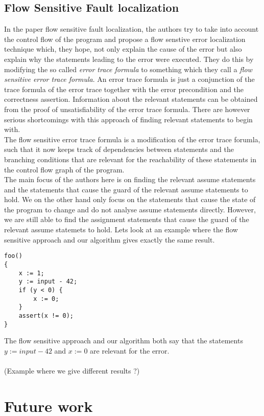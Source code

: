 \documentclass{article}
\begin{document}
\subsection{Flow Sensitive Fault localization \cite{faultlocalization} } 
In the paper flow sensitive fault localization, the authors try to take into account the control flow of the program and propose a flow senstive error localization technique which, they hope, not only explain the cause of the error but also explain why the statements leading to the error were executed. They do this by modifying the so called \textit{error trace formula} to something which they call a \textit{flow sensitive error trace formula}. An error trace formula is just a conjunction of the trace formula of the error trace together with the error precondition and the correctness assertion. Information about the relevant statements can be obtained from the proof of unsatisfiability of the error trace formula. There are however serious shortcomings with this approach of finding relevant statements to begin with.\\
The flow sensitive error trace formula is a modification of the error trace forumla, such that it now keeps track of dependencies between statements and the branching conditions that are relevant for the reachability of these statements in the control flow graph of the program. \\
The main focus of the authors here is on finding the relevant assume statements and the statements that cause the guard of the relevant assume statements to hold. We on the other hand only focus on the statements that cause the state of the program to change and do not analyse assume statements directly. However, we are still able to find the assignment statements that cause the guard of the relevant assume statemets to hold. Lets look at an example where the flow sensitive approach and our algorithm gives exactly the same result.
\begin{lstlisting}
foo()
{
	x := 1;
	y := input - 42;
	if (y < 0) {
		x := 0;	
	}
	assert(x != 0);
}
\end{lstlisting}
The flow sensitive approach and our algorithm both say that the statements $y := input - 42$ and $x := 0$ are relevant for the error. \\
\\
(Example where we give different results ?)
\section{Future work}
\end{document}
